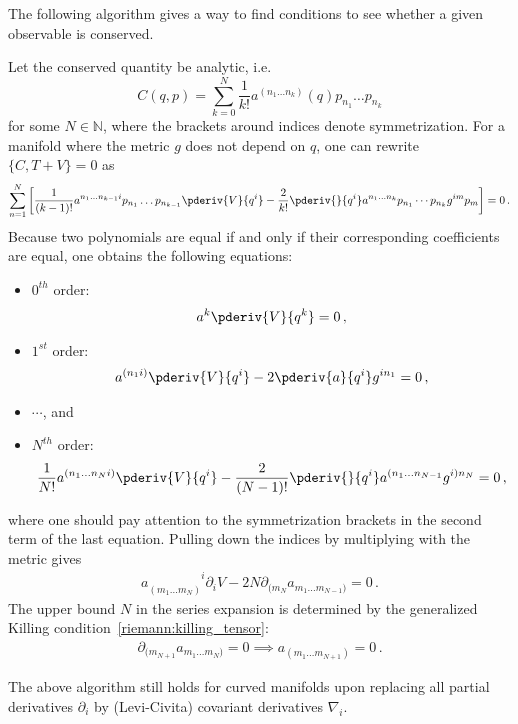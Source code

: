     The following algorithm gives a way to find conditions to see whether a given observable is conserved.
    \begin{method}
        Let the conserved quantity be analytic, i.e.~\[C(q,p) = \sum_{k=0}^N\frac{1}{k!}a^{(n_1\ldots n_k)}(q)p_{n_1}\ldots p_{n_k}\] for some $N\in\mathbb{N}$, where the brackets around indices denote symmetrization. For a manifold where the metric $g$ does not depend on $q$, one can rewrite $\{C,T+V\} = 0$ as \[\sum_{n=1}^N\left[\frac{1}{(k-1)!}a^{n_1\ldots n_{k-1}i}p_{n_1}\ldots p_{n_{k-1}}\pderiv{V}{q^i} - \frac{2}{k!}\pderiv{}{q^i}a^{n_1\ldots n_k}p_{n_1}\cdots p_{n_k}g^{im}p_m\right] = 0\,.\] Because two polynomials are equal if and only if their corresponding coefficients are equal, one obtains the following equations:
        \begin{itemize}
            \item $0^{th}$ order:
                \begin{gather}
                    a^k\pderiv{V}{q^k} = 0\,,
                \end{gather}
            \item $1^{st}$ order:
                \begin{gather}
                    a^{(n_1i)}\pderiv{V}{q^i} - 2\pderiv{a}{q^i}g^{in_1} = 0\,,
                \end{gather}
            \item $\cdots$, and
            \item $N^{th}$ order:
                \begin{gather}
                    \frac{1}{N!}a^{(n_1\ldots n_Ni)}\pderiv{V}{q^i} - \frac{2}{(N-1)!}\pderiv{}{q^i}a^{(n_1\ldots n_{N-1}}g^{i)n_N} = 0\,,
                \end{gather}
        \end{itemize}
        where one should pay attention to the symmetrization brackets in the second term of the last equation. Pulling down the indices by multiplying with the metric gives
        \begin{gather}
            a_{(m_1\ldots m_N)}^{\phantom{(m_1\ldots m_N)}i}\partial_iV - 2N\partial_{(m_N}a_{m_1\ldots m_{N-1})} = 0\,.
        \end{gather}
        The upper bound $N$ in the series expansion is determined by the generalized Killing condition~\eqref{riemann:killing_tensor}:
        \begin{gather}
            \partial_{(m_{N+1}}a_{m_1\ldots m_N)} = 0\implies a_{(m_1\ldots m_{N+1})} = 0\,.
        \end{gather}
    \end{method}
    \begin{remark}
        The above algorithm still holds for curved manifolds upon replacing all partial derivatives $\partial_i$ by (Levi-Civita) covariant derivatives $\nabla_i$.
    \end{remark}

